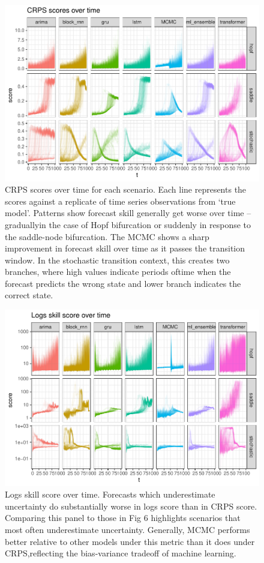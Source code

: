\documentclass{article}
\begin{document}
\begin{figure}
\centering
\includegraphics{manuscript_files/figure-latex/figure6-1.pdf}
\caption{CRPS scores over time for each scenario. Each line represents
the scores against a replicate of time series observations from `true
model'. Patterns show forecast skill generally get worse over time --
graduallyin the case of Hopf bifurcation or suddenly in response to the
saddle-node bifurcation. The MCMC shows a sharp improvement in forecast
skill over time as it passes the transition window. In the stochastic
transition context, this creates two branches, where high values
indicate periods oftime when the forecast predicts the wrong state and
lower branch indicates the correct state.}
\end{figure}

\begin{figure}
\centering
\includegraphics{manuscript_files/figure-latex/figure7-1.pdf}
\caption{Logs skill score over time. Forecasts which underestimate
uncertainty do substantially worse in logs score than in CRPS score.
Comparing this panel to those in Fig 6 highlights scenarios that most
often underestimate uncertainty. Generally, MCMC performs better
relative to other models under this metric than it does under
CRPS,reflecting the bias-variance tradeoff of machine learning.}
\end{figure}
\end{document}
